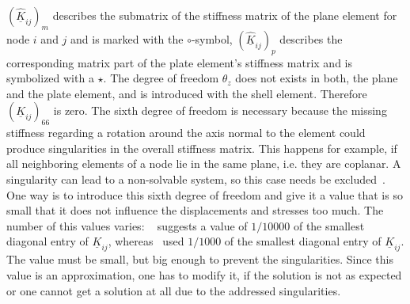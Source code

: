  $\left(\underline{\hat{K}}_{ij}\right)_m$ describes the submatrix of the stiffness matrix of the plane element for node $i$ and $j$ and is marked with the $\circ$-symbol, $\left(\underline{\hat{K}}_{ij}\right)_p$ describes the corresponding matrix part of the plate element's stiffness matrix and is symbolized with a $\star$.
 The degree of freedom $\theta_z$ does not exists in both, the plane and the plate element, and is introduced with the shell element. Therefore $(\underline{K}_{ij})_{66}$ is zero. The sixth degree of freedom is necessary because the missing stiffness regarding a rotation around the axis normal to the element could produce singularities in the overall stiffness matrix. This happens for example, if all neighboring elements of a node lie in the same plane, i.e. they are coplanar. A singularity can lead to a non-solvable system, so this case needs be excluded~\cite{steinke2005finite}. One way is to introduce this sixth degree of freedom and give it a value that is so small that it does not influence the displacements and stresses too much. The number of this values varies: ~\cite{werkle1995finite} suggests a value of $1/10000$ of the smallest diagonal entry of $\underline{K}_{ij}$, whereas~\cite{kansara2004development} used $1/1000$ of the smallest diagonal entry of $\underline{K}_{ij}$. The value must be small, but big enough to prevent the singularities. Since this value is an approximation, one has to modify it, if the solution is not as expected or one cannot get a solution at all due to the addressed singularities.
 
